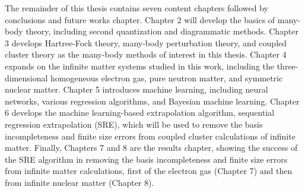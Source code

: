 The remainder of this thesis contains seven content chapters followed by conclusions and future works chapter. Chapter 2 will develop the basics of many-body theory, including second quantization and diagrammatic methods. Chapter 3 develops Hartree-Fock theory, many-body perturbation theory, and coupled cluster theory as the many-body methods of interest in this thesis. Chapter 4 expands on the infinite matter systems studied in this work, including the three-dimensional homogeneous electron gas, pure neutron matter, and symmetric nuclear matter. Chapter 5 introduces machine learning, including neural networks, various regression algorithms, and Bayesian machine learning. Chapter 6 develops the machine learning-based extrapolation algorithm, sequential regression extrapolation (SRE), which will be used to remove the basis incompleteness and finite size errors from coupled cluster calculations of infinite matter. Finally, Chapters 7 and 8 are the results chapter, showing the success of the SRE algorithm in removing the basis incompleteness and finite size errors from infinite matter calculations, first of the electron gas (Chapter 7) and then from infinite nuclear matter (Chapter 8).
